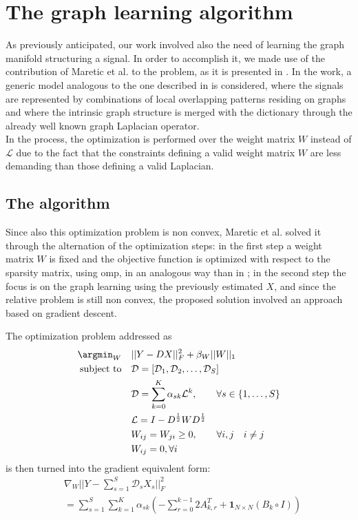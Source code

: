 \chapter{The graph learning algorithm}
As previously anticipated, our work involved also the need of learning the graph manifold structuring a signal. In order to accomplish it, we made use of the contribution of Maretic et al. to the problem, as it is presented in \cite{Maretic2017}. In the work, a generic model analogous to the one described in \cite {Thanou2014} is considered, where the signals are represented by combinations of local overlapping patterns residing on graphs and where the intrinsic graph structure is merged with the dictionary through the already well known graph Laplacian operator.\\
In the process, the optimization is performed over the weight matrix $W$ instead of $\mathcal{L}$ due to the fact that the constraints defining a valid weight matrix $W$ are less demanding than those defining a valid Laplacian.

\section{The algorithm}
Since also this optimization problem is non convex, Maretic et al. solved it through the alternation of the optimization steps: in the first step a weight matrix $W$ is fixed and the objective function is optimized with respect to the sparsity matrix, using \gls{omp}, in an analogous way than in \cite{Thanou2014}; in the second step the focus is on the graph learning using the previously estimated $X$, and since the relative problem is still non convex, the proposed solution involved an approach based on gradient descent.

The optimization problem addressed as
\begin{align}
\argmin_W \quad &||Y - DX||_F^2 + \beta_W ||W||_1\\
\text{subject to} \quad &\mathcal{D} = [\mathcal{D}_1,\mathcal{D}_2,\dots,\mathcal{D}_S]\\
                        &\mathcal{D} = \sum_{k=0}^{K}\alpha_{sk}\mathcal{L}^k, \qquad \forall s \in \{1,\dots,S\}\\
                        &\mathcal{L} = I - D^{\frac{1}{2}}WD^{\frac{1}{2}}\\
                        &W_{ij} = W_{ji} \geq 0, \qquad \forall i,j \quad i \ne j\\
                        &W_{ij} = 0, \forall i
\end{align}
is then turned into the gradient equivalent form:
\begin{equation}
\begin{split}
&\nabla_W ||Y - \sum_{s=1}^{S}\mathcal{D}_s X_s||_F^2\\
&= \sum_{s=1}^S \sum_{k=1}^K \alpha_{sk} (- \sum_{r = 0}^{k-1}2A^T_{k,r}+\textbf{1}_{N\times N}(B_k \circ I))
\end{split}
\end{equation}


